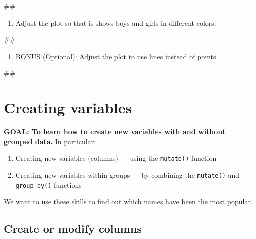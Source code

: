 \documentclass[]{book}
\newenvironment{Shaded}{\begin{snugshade}}{\end{snugshade}}
\newcommand{\NormalTok}[1]{#1}
\providecommand{\tightlist}{%
  \setlength{\itemsep}{0pt}\setlength{\parskip}{0pt}}
\begin{document}
\begin{Shaded}
\begin{Highlighting}[]
\NormalTok{##}
\end{Highlighting}
\end{Shaded}

\begin{enumerate}
\def\labelenumi{\arabic{enumi}.}
\setcounter{enumi}{2}
\tightlist
\item
  Adjust the plot so that is shows boys and girls in different colors.
\end{enumerate}

\begin{Shaded}
\begin{Highlighting}[]
\NormalTok{##}
\end{Highlighting}
\end{Shaded}

\begin{enumerate}
\def\labelenumi{\arabic{enumi}.}
\setcounter{enumi}{3}
\tightlist
\item
  BONUS (Optional): Adjust the plot to use lines instead of points.
\end{enumerate}

\begin{Shaded}
\begin{Highlighting}[]
\NormalTok{##}
\end{Highlighting}
\end{Shaded}

\section{Creating variables}\label{creating-variables}

\textbf{GOAL: To learn how to create new variables with and without
grouped data.} In particular:

\begin{enumerate}
\def\labelenumi{\arabic{enumi}.}
\tightlist
\item
  Creating new variables (columns) --- using the \texttt{mutate()}
  function
\item
  Creating new variables within groups --- by combining the
  \texttt{mutate()} and \texttt{group\_by()} functions
\end{enumerate}

We want to use these skills to find out which names have been the most
popular.

\subsection{Create or modify columns}\label{create-or-modify-columns}
\end{document}

